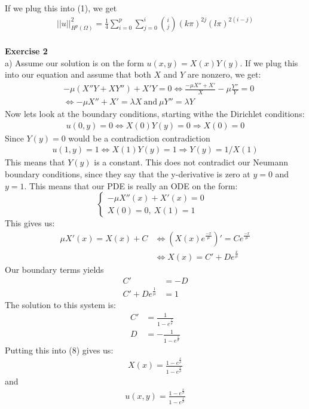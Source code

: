 \documentclass[11pt,a4paper]{report}
\begin{document}
If we plug this into (1), we get
\begin{gather*}
||u||_{H^p(\Omega)}^2 = \frac{1}{4}\sum_{i=0}^p \sum_{j=0}^{i}\binom {i} {j}(k\pi)^{2j}(l\pi)^{2(i-j)}  
\end{gather*}
\\
\textbf{Exercise 2}
\\
a) Assume our solution is on the form $u(x,y)=X(x)Y(y)$. If we plug this into our equation and assume that both $X$ and $Y$ are nonzero, we get:
\begin{align*}
&-\mu(X''Y+XY'') + X'Y = 0 \iff \frac{- \mu X''+X'}{X} - \mu\frac{Y''}{Y}=0 \\
&\iff - \mu X''+X'=\lambda X \ \text{and} \ \mu Y'' = \lambda Y
\end{align*} 
Now lets look at the boundary conditions, starting withe the Dirichlet conditions:
\begin{align*}
u(0,y)=0 \iff X(0)Y(y)=0 \Rightarrow X(0)=0 
\end{align*}
Since $Y(y)=0$ would be a contradiction contradiction
\begin{align*}
u(1,y)=1 \iff X(1)Y(y)=1 \Rightarrow Y(y)=1/X(1)
\end{align*} 
This means that $Y(y)$ is a constant. This does not contradict our Neumann boundary conditions, since they say that the y-derivative is zero at $y=0$ and $y=1$. This means that our PDE is really an ODE on the form:
\begin{displaymath}
   \left\{
     \begin{array}{lr}
       -\mu X''(x)+X'(x)= 0&   \\
       X(0)= 0, \ X(1)=1 &  
     \end{array}
   \right.
\end{displaymath}
This gives us: 
\begin{align}
\mu X'(x) = X(x) + C &\iff (X(x)e^{\frac{-x}{\mu}})'=Ce^{\frac{-x}{\mu}} \\
&\iff X(x) = C' + De^{\frac{x}{\mu}}
\end{align}
Our boundary terms yields
\begin{align*}
C'&=-D\\
C'+De^{\frac{1}{\mu}}&=1
\end{align*}
The solution to this system is:
\begin{align*}
C'&=\frac{1}{1-e^{\frac{1}{\mu}}} \\
D&=-\frac{1}{1-e^{\frac{1}{\mu}}}
\end{align*}
Putting this into (8) gives us:
\begin{align*}
X(x)=\frac{1-e^{\frac{x}{\mu}}}{1-e^{\frac{1}{\mu}}}
\end{align*}
and 
\begin{align*}
u(x,y)=\frac{1-e^{\frac{x}{\mu}}}{1-e^{\frac{1}{\mu}}}
\end{align*}
\end{document}
